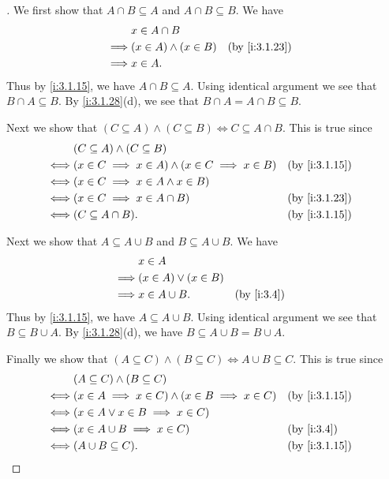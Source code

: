 \begin{proof}[]
  We first show that \(A \cap B \subseteq A\) and \(A \cap B \subseteq B\).
  We have
  \begin{align*}
             & x \in A \cap B                               \\
    \implies & (x \in A) \land (x \in B) &  & \by{i:3.1.23} \\
    \implies & x \in A.
  \end{align*}
  Thus by \cref{i:3.1.15}, we have \(A \cap B \subseteq A\).
  Using identical argument we see that \(B \cap A \subseteq B\).
  By \cref{i:3.1.28}(d), we see that \(B \cap A = A \cap B \subseteq B\).

  Next we show that \((C \subseteq A) \land (C \subseteq B) \iff C \subseteq A \cap B\).
  This is true since
  \begin{align*}
         & (C \subseteq A) \land (C \subseteq B)                                          \\
    \iff & (x \in C \implies x \in A) \land (x \in C \implies x \in B) &  & \by{i:3.1.15} \\
    \iff & (x \in C \implies x \in A \land x \in B)                                       \\
    \iff & (x \in C \implies x \in A \cap B)                           &  & \by{i:3.1.23} \\
    \iff & (C \subseteq A \cap B).                                     &  & \by{i:3.1.15}
  \end{align*}

  Next we show that \(A \subseteq A \cup B\) and \(B \subseteq A \cup B\).
  We have
  \begin{align*}
             & x \in A                                  \\
    \implies & (x \in A) \lor (x \in B)                 \\
    \implies & x \in A \cup B.          &  & \by{i:3.4}
  \end{align*}
  Thus by \cref{i:3.1.15}, we have \(A \subseteq A \cup B\).
  Using identical argument we see that \(B \subseteq B \cup A\).
  By \cref{i:3.1.28}(d), we have \(B \subseteq A \cup B = B \cup A\).

  Finally we show that \((A \subseteq C) \land (B \subseteq C) \iff A \cup B \subseteq C\).
  This is true since
  \begin{align*}
         & (A \subseteq C) \land (B \subseteq C)                                          \\
    \iff & (x \in A \implies x \in C) \land (x \in B \implies x \in C) &  & \by{i:3.1.15} \\
    \iff & (x \in A \lor x \in B \implies x \in C)                                        \\
    \iff & (x \in A \cup B \implies x \in C)                           &  & \by{i:3.4}    \\
    \iff & (A \cup B \subseteq C).                                     &  & \by{i:3.1.15}
  \end{align*}
\end{proof}

